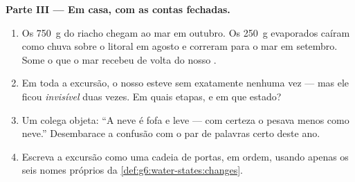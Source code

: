\begin{problem}
\medskip\noindent\textbf{Parte III --- Em casa, com as contas
fechadas.}
\begin{enumerate}[resume]
  \item Os \qty{750}{g} do riacho chegam ao mar em outubro. Os
        \qty{250}{g} evaporados caíram como chuva sobre o litoral em
        agosto e correram para o mar em setembro. Some o que o mar
        recebeu de volta do nosso .
  \item Em toda a excursão, o nosso  esteve sem 
        exatamente nenhuma vez --- mas ele ficou \emph{invisível}
        duas vezes. Em quais etapas, e em que estado?
  \item Um colega objeta: ``A neve é fofa e leve --- com certeza o
         pesava menos como neve.'' Desembarace a confusão
        com o par de palavras certo deste ano.
  \item Escreva a excursão como uma cadeia de portas, em ordem,
        usando apenas os seis nomes próprios da
        \cref{def:g6:water-states:changes}.
\end{enumerate}
\end{problem}
